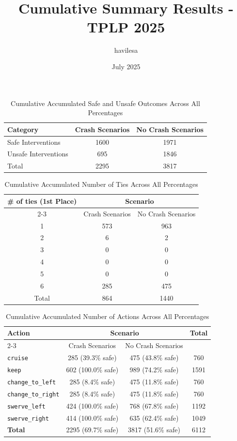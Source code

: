 \documentclass{article}
\title{Cumulative Summary Results - TPLP 2025}
\author{havilesa}
\date{July 2025}
\begin{document}
\maketitle

\begin{table}[h]
\centering
\caption{Cumulative Accumulated Safe and Unsafe Outcomes Across All Percentages}
\begin{tabular}{l|cc}
\toprule
Category & Crash Scenarios & No Crash Scenarios \\
\midrule
Safe Interventions & 1600 & 1971 \\ 
Unsafe Interventions & 695 & 1846 \\ 
\midrule
Total & 2295 & 3817 \\ 
\bottomrule
\end{tabular}
\end{table}

\begin{table}[h]
\centering
\caption{Cumulative Accumulated Number of Ties Across All Percentages}
\begin{tabular}{c|cc}
\toprule
\multirow{2}{*}{\# of ties (1st Place)} & \multicolumn{2}{c|}{Scenario} \\
\cmidrule{2-3}
 & Crash Scenarios & No Crash Scenarios \\
\midrule
1 & 573 & 963 \\ 
2 & 6 & 2 \\ 
3 & 0 & 0 \\ 
4 & 0 & 0 \\ 
5 & 0 & 0 \\ 
6 & 285 & 475 \\ 
\midrule
Total & 864 & 1440 \\ 
\bottomrule
\end{tabular}
\end{table}

\begin{table}[h]
\centering
\caption{Cumulative Accumulated Number of Actions Across All Percentages}
\begin{tabular}{l|cc|c}
\toprule
\multirow{2}{*}{Action} & \multicolumn{2}{c|}{Scenario} & \multirow{2}{*}{Total} \\
\cmidrule{2-3}
 & Crash Scenarios & No Crash Scenarios \\
\midrule
\texttt{cruise} & 285 (39.3\% safe) & 475 (43.8\% safe) & 760 \\ 
\texttt{keep} & 602 (100.0\% safe) & 989 (74.2\% safe) & 1591 \\ 
\texttt{change\_to\_left} & 285 (8.4\% safe) & 475 (11.8\% safe) & 760 \\ 
\texttt{change\_to\_right} & 285 (8.4\% safe) & 475 (11.8\% safe) & 760 \\ 
\texttt{swerve\_left} & 424 (100.0\% safe) & 768 (67.8\% safe) & 1192 \\ 
\texttt{swerve\_right} & 414 (100.0\% safe) & 635 (62.4\% safe) & 1049 \\ 
\midrule
\textbf{Total} & 2295 (69.7\% safe) & 3817 (51.6\% safe) & 6112 \\ 
\bottomrule
\end{tabular}
\end{table}
\end{document}
